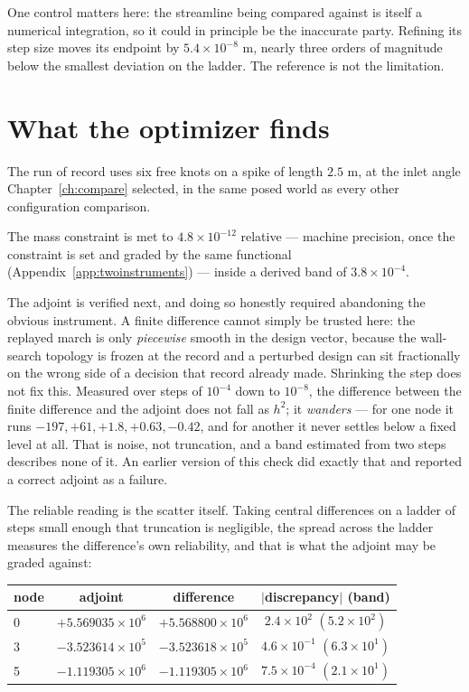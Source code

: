 One control matters here: the streamline being compared against is
itself a numerical integration, so it could in principle be the
inaccurate party. Refining its step size moves its endpoint by
$5.4\times10^{-8}$ m, nearly three orders of magnitude below the
smallest deviation on the ladder. The reference is not the
limitation.

\section{What the optimizer finds}
\label{sec:splineres}

The run of record uses six free knots on a spike of length $2.5$ m, at
the inlet angle Chapter~\ref{ch:compare} selected, in the same posed
world as every other configuration comparison.

The mass constraint is met to $4.8\times10^{-12}$ relative --- machine
precision, once the constraint is set and graded by the same
functional (Appendix~\ref{app:twoinstruments}) --- inside a derived
band of $3.8\times10^{-4}$.

The adjoint is verified next, and doing so honestly required
abandoning the obvious instrument. A finite difference cannot simply
be trusted here: the replayed march is only \emph{piecewise} smooth
in the design vector, because the wall-search topology is frozen at
the record and a perturbed design can sit fractionally on the wrong
side of a decision that record already made. Shrinking the step does
not fix this. Measured over steps of $10^{-4}$ down to $10^{-8}$, the
difference between the finite difference and the adjoint does not
fall as $h^2$; it \emph{wanders} --- for one node it runs
$-197, +61, +1.8, +0.63, -0.42$, and for another it never settles
below a fixed level at all. That is noise, not truncation, and a band
estimated from two steps describes none of it. An earlier version of
this check did exactly that and reported a correct adjoint as a
failure.

The reliable reading is the scatter itself. Taking central
differences on a ladder of steps small enough that truncation is
negligible, the spread across the ladder measures the difference's
own reliability, and that is what the adjoint may be graded against:

\begin{center}
\begin{tabular}{lccc}
\toprule
node & adjoint & difference & $|$discrepancy$|$ (band) \\
\midrule
0 & $+5.569035\times10^{6}$ & $+5.568800\times10^{6}$ &
  $2.4\times10^{2}$ $(5.2\times10^{2})$ \\
3 & $-3.523614\times10^{5}$ & $-3.523618\times10^{5}$ &
  $4.6\times10^{-1}$ $(6.3\times10^{1})$ \\
5 & $-1.119305\times10^{6}$ & $-1.119305\times10^{6}$ &
  $7.5\times10^{-4}$ $(2.1\times10^{1})$ \\
\bottomrule
\end{tabular}
\end{center}


